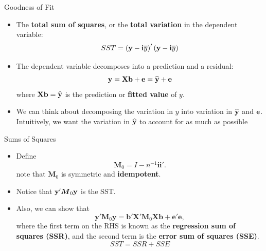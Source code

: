 \begin{frame}{Goodness of Fit}
\begin{itemize}
	\item The {\bf total sum of squares}, or the {\bf total variation} in the dependent variable:\[
	SST = \left({\bf y} - {\bf i} \overline{y} \right)' \left({\bf y} - {\bf i} \overline{y} \right)
	\]

	\smallskip
	\item The dependent variable decomposes into a prediction and a residual:\[
	{\bf y} = {\bf X} {\bf b} + {\bf e} =  \widehat{{\bf y}} + {\bf e}
	\]
where ${\bf X} {\bf b} =  \widehat{{\bf y}}$ is the prediction or {\bf fitted value} of $y$. 

	\smallskip
	\item We can think about decomposing the variation in $y$ into variation in $ \widehat{{\bf y}}$ and ${\bf e}$.
	Intuitively, we want the variation in  $ \widehat{{\bf y}}$ to account for as much as possible
\end{itemize}
\end{frame}



\begin{frame}{Sums of Squares}
\begin{itemize}
	\item Define \[
\boldsymbol{M}_{0}=I-n^{-1}\boldsymbol{i}\boldsymbol{i}'.
\]
note that $\boldsymbol{M}_{0}$ is symmetric and {\bf idempotent}.

\smallskip
\item Notice that $ {\bf y}'\boldsymbol{M}_{0}{\bf y}$ is the SST. 

\smallskip
\item Also, we can show that
\[
\boldsymbol{y}'\boldsymbol{M}_{0}\boldsymbol{y}=\boldsymbol{b}'\boldsymbol{X}'\boldsymbol{M}_{0}\boldsymbol{X}\boldsymbol{b}+\boldsymbol{e}'\boldsymbol{e},
\]
where the first term on the RHS is known as the \textbf{regression
sum of squares (SSR)}, and the second term is the \textbf{error sum
of squares (SSE)}.\[
SST = SSR + SSE
\]
	
\end{itemize}
\end{frame}

